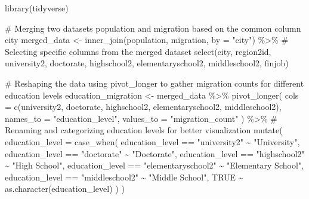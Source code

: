 \documentclass[
  11pt,
  a4paper,
  DIV=11,
  numbers=noendperiod]{scrartcl}
\newenvironment{Shaded}{\begin{snugshade}}{\end{snugshade}}
\newcommand{\AttributeTok}[1]{\textcolor[rgb]{0.40,0.45,0.13}{#1}}
\newcommand{\CommentTok}[1]{\textcolor[rgb]{0.37,0.37,0.37}{#1}}
\newcommand{\ConstantTok}[1]{\textcolor[rgb]{0.56,0.35,0.01}{#1}}
\newcommand{\FunctionTok}[1]{\textcolor[rgb]{0.28,0.35,0.67}{#1}}
\newcommand{\NormalTok}[1]{\textcolor[rgb]{0.00,0.23,0.31}{#1}}
\newcommand{\OtherTok}[1]{\textcolor[rgb]{0.00,0.23,0.31}{#1}}
\newcommand{\SpecialCharTok}[1]{\textcolor[rgb]{0.37,0.37,0.37}{#1}}
\newcommand{\StringTok}[1]{\textcolor[rgb]{0.13,0.47,0.30}{#1}}
\begin{document}
\begin{Shaded}
\begin{Highlighting}[]
\FunctionTok{library}\NormalTok{(tidyverse)}

\CommentTok{\# Merging two datasets \textquotesingle{}population\textquotesingle{} and \textquotesingle{}migration\textquotesingle{} based on the common column \textquotesingle{}city\textquotesingle{}}
\NormalTok{merged\_data }\OtherTok{\textless{}{-}} \FunctionTok{inner\_join}\NormalTok{(population, migration, }\AttributeTok{by =} \StringTok{"city"}\NormalTok{) }\SpecialCharTok{\%\textgreater{}\%}
  \CommentTok{\# Selecting specific columns from the merged dataset}
  \FunctionTok{select}\NormalTok{(city, region2id, university2, doctorate, highschool2, elementaryschool2, middleschool2, finjob)}

\CommentTok{\# Reshaping the data using pivot\_longer to gather migration counts for different education levels}
\NormalTok{education\_migration }\OtherTok{\textless{}{-}}\NormalTok{ merged\_data }\SpecialCharTok{\%\textgreater{}\%}
  \FunctionTok{pivot\_longer}\NormalTok{(}
    \AttributeTok{cols =} \FunctionTok{c}\NormalTok{(university2, doctorate, highschool2, elementaryschool2, middleschool2),}
    \AttributeTok{names\_to =} \StringTok{"education\_level"}\NormalTok{,}
    \AttributeTok{values\_to =} \StringTok{"migration\_count"}
\NormalTok{  ) }\SpecialCharTok{\%\textgreater{}\%}
  \CommentTok{\# Renaming and categorizing education levels for better visualization}
  \FunctionTok{mutate}\NormalTok{(}
    \AttributeTok{education\_level =} \FunctionTok{case\_when}\NormalTok{(}
\NormalTok{      education\_level }\SpecialCharTok{==} \StringTok{"university2"} \SpecialCharTok{\textasciitilde{}} \StringTok{"University"}\NormalTok{,}
\NormalTok{      education\_level }\SpecialCharTok{==} \StringTok{"doctorate"} \SpecialCharTok{\textasciitilde{}} \StringTok{"Doctorate"}\NormalTok{,}
\NormalTok{      education\_level }\SpecialCharTok{==} \StringTok{"highschool2"} \SpecialCharTok{\textasciitilde{}} \StringTok{"High School"}\NormalTok{,}
\NormalTok{      education\_level }\SpecialCharTok{==} \StringTok{"elementaryschool2"} \SpecialCharTok{\textasciitilde{}} \StringTok{"Elementary School"}\NormalTok{,}
\NormalTok{      education\_level }\SpecialCharTok{==} \StringTok{"middleschool2"} \SpecialCharTok{\textasciitilde{}} \StringTok{"Middle School"}\NormalTok{,}
      \ConstantTok{TRUE} \SpecialCharTok{\textasciitilde{}} \FunctionTok{as.character}\NormalTok{(education\_level)}
\NormalTok{    )}
\NormalTok{  )}


\end{Highlighting}
\end{Shaded}
\end{document}
